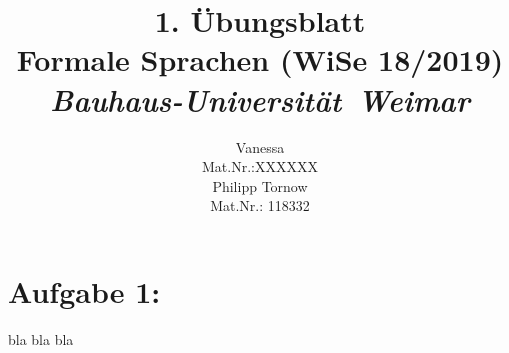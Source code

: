 \documentclass[11pt]{article}
\theoremstyle{definition}
\theoremstyle{remark}
\begin{document}
    \title{1. Übungsblatt\\
    Formale Sprachen (WiSe 18/2019)\\
    \textit{Bauhaus-Universität\ Weimar\\}
    }
    \author{Vanessa\\
    \vspace{5mm}
    \normalsize Mat.Nr.:XXXXXX\\
    \large Philipp Tornow\\
    \vspace {5mm}
    \normalsize Mat.Nr.: 118332\\
    }

    \maketitle

    \newpage
    \section*{Aufgabe 1:}
    \begin{normalsize}
        bla bla bla
    \end{normalsize}
\end{document}
